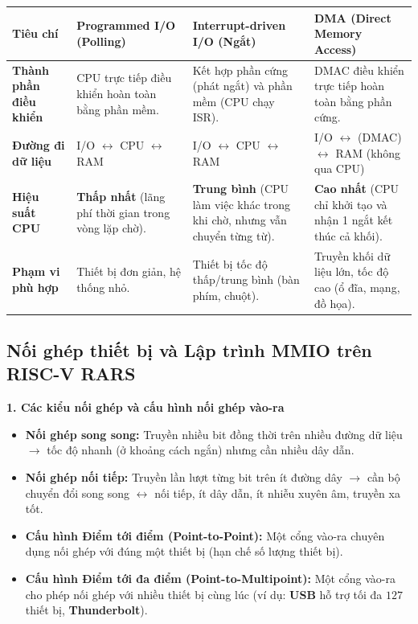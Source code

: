 \begin{tcolorbox}[bwbox, title={So sánh ba phương pháp điều khiển Vào-Ra (Hiệu suất sử dụng CPU tăng dần)}]
\begin{center}
\renewcommand{\arraystretch}{1.25}
\small
\begin{tabularx}{\linewidth}{|L{2.8cm}|Y|Y|Y|}
\hline
\textbf{Tiêu chí} & \textbf{Programmed I/O (Polling)} & \textbf{Interrupt-driven I/O (Ngắt)} & \textbf{DMA (Direct Memory Access)} \\ \hline
\textbf{Thành phần điều khiển} & CPU trực tiếp điều khiển hoàn toàn bằng phần mềm. & Kết hợp phần cứng (phát ngắt) và phần mềm (CPU chạy ISR). & DMAC điều khiển trực tiếp hoàn toàn bằng phần cứng. \\ \hline
\textbf{Đường đi dữ liệu} & I/O $\leftrightarrow$ CPU $\leftrightarrow$ RAM & I/O $\leftrightarrow$ CPU $\leftrightarrow$ RAM & I/O $\leftrightarrow$ (DMAC) $\leftrightarrow$ RAM (không qua CPU) \\ \hline
\textbf{Hiệu suất CPU} & \textbf{Thấp nhất} (lãng phí thời gian trong vòng lặp chờ). & \textbf{Trung bình} (CPU làm việc khác trong khi chờ, nhưng vẫn chuyển từng từ). & \textbf{Cao nhất} (CPU chỉ khởi tạo và nhận 1 ngắt kết thúc cả khối). \\ \hline
\textbf{Phạm vi phù hợp} & Thiết bị đơn giản, hệ thống nhỏ. & Thiết bị tốc độ thấp/trung bình (bàn phím, chuột). & Truyền khối dữ liệu lớn, tốc độ cao (ổ đĩa, mạng, đồ họa). \\ \hline
\end{tabularx}
\end{center}
\end{tcolorbox}

\subsection{Nối ghép thiết bị và Lập trình MMIO trên RISC-V RARS}

\textbf{1. Các kiểu nối ghép và cấu hình nối ghép vào-ra}
\begin{itemize}
    \item \textbf{Nối ghép song song:} Truyền nhiều bit đồng thời trên nhiều đường dữ liệu $\rightarrow$ tốc độ nhanh (ở khoảng cách ngắn) nhưng cần nhiều dây dẫn.
    \item \textbf{Nối ghép nối tiếp:} Truyền lần lượt từng bit trên ít đường dây $\rightarrow$ cần bộ chuyển đổi song song $\leftrightarrow$ nối tiếp, ít dây dẫn, ít nhiễu xuyên âm, truyền xa tốt.
    \item \textbf{Cấu hình Điểm tới điểm (Point-to-Point):} Một cổng vào-ra chuyên dụng nối ghép với đúng một thiết bị (hạn chế số lượng thiết bị).
    \item \textbf{Cấu hình Điểm tới đa điểm (Point-to-Multipoint):} Một cổng vào-ra cho phép nối ghép với nhiều thiết bị cùng lúc (ví dụ: \textbf{USB} hỗ trợ tối đa $127$ thiết bị, \textbf{Thunderbolt}).
\end{itemize}

